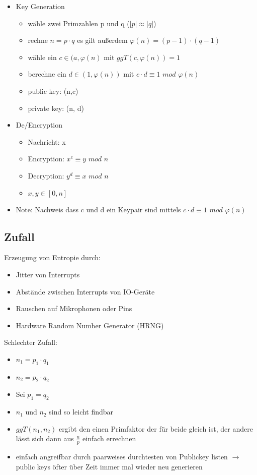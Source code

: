 \documentclass[12pt,a4paper]{article}
\begin{document}
\begin{itemize}
\item Key Generation
\begin{itemize}
\item wähle zwei Primzahlen p und q ($ |p| \approx |q|$)
\item rechne $n=p\cdot q$ es gilt außerdem $\varphi(n) = (p-1) \cdot (q-1)$
\item wähle ein $c \in (a, \varphi(n)$ mit $ ggT(c, \varphi(n)) = 1$
\item berechne ein $d \in (1,\varphi(n))$ mit $c\cdot d \equiv 1\hspace{4pt} mod\hspace{4pt} \varphi(n)$
\item public key: (n,c)
\item private key: (n, d)
\end{itemize}
\item De/Encryption
\begin{itemize}
\item Nachricht: x
\item Encryption: $x^c \equiv y\hspace{4pt} mod \hspace{4pt} n$
\item Decryption: $y^d \equiv x\hspace{4pt} mod \hspace{4pt} n$
\item $x, y \in [0,n]$ 
\end{itemize}
\item Note: Nachweis dass c und d ein Keypair sind mittels $c \cdot d \equiv 1 \hspace{4pt} mod \hspace{4pt} \varphi(n)$
\end{itemize}

\subsection{Zufall}
Erzeugung von Entropie durch:
\begin{itemize}
\item Jitter von Interrupts
\item Abstände zwischen Interrupts von IO-Geräte
\item Rauschen auf Mikrophonen oder Pins
\item Hardware Random Number Generator (HRNG)
\end{itemize}
Schlechter Zufall:
\begin{itemize}
\item $n_1= p_1 \cdot q_1$
\item $n_2= p_2 \cdot q_2$
\item Sei $p_1 = q_2$
\item $n_1$ und $n_2$ sind so leicht findbar
\item $ggT(n_1, n_2)$ ergibt den einen Primfaktor der für beide gleich ist, der andere lässt sich dann aus $\frac{n}{p}$ einfach errechnen
\item einfach angreifbar durch paarweises durchtesten von Publickey listen $\rightarrow$ public keys öfter über Zeit immer mal wieder neu generieren
\end{itemize}
\end{document}
